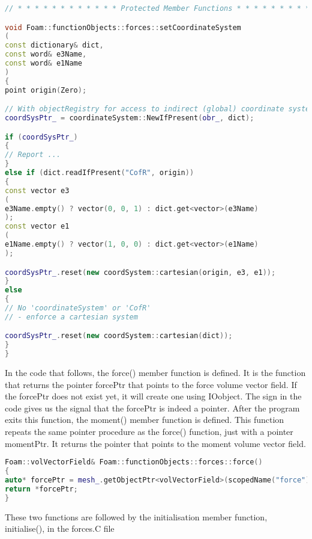 \begin{lstlisting}[language=C++, caption=Setting up coordinate system for forces and moments calculation in \texttt{forces.C} file]
// * * * * * * * * * * * * Protected Member Functions * * * * * * * * * * * //

void Foam::functionObjects::forces::setCoordinateSystem
(
const dictionary& dict,
const word& e3Name,
const word& e1Name
)
{
point origin(Zero);

// With objectRegistry for access to indirect (global) coordinate systems
coordSysPtr_ = coordinateSystem::NewIfPresent(obr_, dict);

if (coordSysPtr_)
{
// Report ...
}
else if (dict.readIfPresent("CofR", origin))
{
const vector e3
(
e3Name.empty() ? vector(0, 0, 1) : dict.get<vector>(e3Name)
);
const vector e1
(
e1Name.empty() ? vector(1, 0, 0) : dict.get<vector>(e1Name)
);

coordSysPtr_.reset(new coordSystem::cartesian(origin, e3, e1));
}
else
{
// No 'coordinateSystem' or 'CofR'
// - enforce a cartesian system

coordSysPtr_.reset(new coordSystem::cartesian(dict));
}
}
\end{lstlisting}

In the code that follows, the force() member function is defined. It is the function that returns the pointer forcePtr that points to the force volume vector field. If the forcePtr does not exist yet, it will create one using IOobject. The sign in the code gives us the signal that the forcePtr is indeed a pointer. After the program exits this function, the moment() member function is defined. This function repeats the same pointer procedure as the force() function, just with a pointer momentPtr. It returns the pointer that points to the moment volume vector field.

\begin{lstlisting}[language=C++, caption=Member function \texttt{force()} in \texttt{forces.C} file]
Foam::volVectorField& Foam::functionObjects::forces::force()
{
auto* forcePtr = mesh_.getObjectPtr<volVectorField>(scopedName("force"));
return *forcePtr;
}
\end{lstlisting}

These two functions are followed by the initialisation member function, initialise(), in the forces.C file

